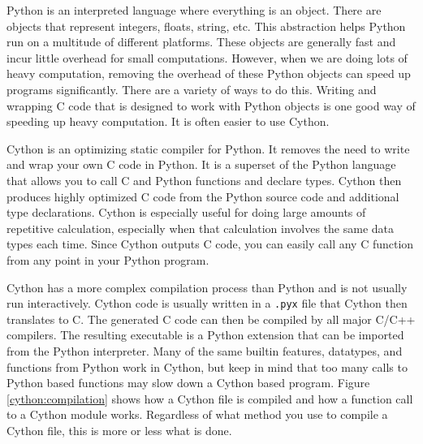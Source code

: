 \label{lab:Cython}

Python is an interpreted language where everything is an object.
There are objects that represent integers, floats, string, etc.
This abstraction helps Python run on a multitude of different platforms.
These objects are generally fast and incur little overhead for small computations.
However, when we are doing lots of heavy computation, removing the overhead of these Python objects can speed up programs significantly.
There are a variety of ways to do this.
Writing and wrapping C code that is designed to work with Python objects is one good way of speeding up heavy computation.
It is often easier to use Cython.

Cython is an optimizing static compiler for Python.  It removes the need to write and wrap your own C code in Python.
It is a superset of the Python language that allows you to call C and Python functions and declare types.
Cython then produces highly optimized C code from the Python source code and additional type declarations.
Cython is especially useful for doing large amounts of repetitive calculation, especially when that calculation involves the same data types each time.
Since Cython outputs C code, you can easily call any C function from any point in your Python program.

Cython has a more complex compilation process than Python and is not usually run interactively.
Cython code is usually written in a \texttt{.pyx} file that Cython then translates to C.
The generated C code can then be compiled by all major C/C++ compilers.
The resulting executable is a Python extension that can be imported from the Python interpreter.
Many of the same builtin features, datatypes, and functions from Python work in Cython, but keep in mind that too many calls to Python based functions may slow down a Cython based program.
Figure \ref{cython:compilation} shows how a Cython file is compiled and how a function call to a Cython module works.
Regardless of what method you use to compile a Cython file, this is more or less what is done.

